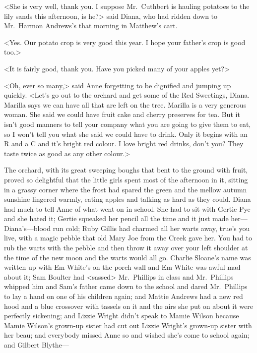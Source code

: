 <She is very well, thank you. I suppose Mr.~Cuthbert is hauling potatoes to the lily sands this afternoon, is he?> said Diana, who had ridden down to Mr.~Harmon Andrews's that morning in Matthew's cart.

<Yes. Our potato crop is very good this year. I hope your father's crop is good too.>

<It is fairly good, thank you. Have you picked many of your apples yet?>

<Oh, ever so many,> said Anne forgetting to be dignified and jumping up quickly. <Let's go out to the orchard and get some of the Red Sweetings, Diana. Marilla says we can have all that are left on the tree. Marilla is a very generous woman. She said we could have fruit cake and cherry preserves for tea. But it isn't good manners to tell your company what you are going to give them to eat, so I won't tell you what she said we could have to drink. Only it begins with an R and a C and it's bright red colour. I love bright red drinks, don't you? They taste twice as good as any other colour.>

The orchard, with its great sweeping boughs that bent to the ground with fruit, proved so delightful that the little girls spent most of the afternoon in it, sitting in a grassy corner where the frost had spared the green and the mellow autumn sunshine lingered warmly, eating apples and talking as hard as they could. Diana had much to tell Anne of what went on in school. She had to sit with Gertie Pye and she hated it; Gertie squeaked her pencil all the time and it just made her—Diana's—blood run cold; Ruby Gillis had charmed all her warts away, true's you live, with a magic pebble that old Mary Joe from the Creek gave her. You had to rub the warts with the pebble and then throw it away over your left shoulder at the time of the new moon and the warts would all go. Charlie Sloane's name was written up with Em White's on the porch wall and Em White was awful mad about it; Sam Boulter had <sassed> Mr.~Phillips in class and Mr.~Phillips whipped him and Sam's father came down to the school and dared Mr.~Phillips to lay a hand on one of his children again; and Mattie Andrews had a new red hood and a blue crossover with tassels on it and the airs she put on about it were perfectly sickening; and Lizzie Wright didn't speak to Mamie Wilson because Mamie Wilson's grown-up sister had cut out Lizzie Wright's grown-up sister with her beau; and everybody missed Anne so and wished she's come to school again; and Gilbert Blythe—

